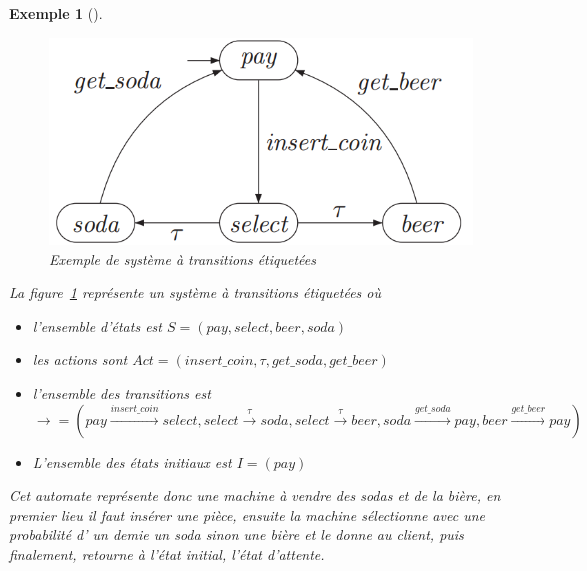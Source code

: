 \documentclass[a4paper]{report}
\theoremstyle{break}
\newtheorem{exem}{Exemple}
\begin{document}
\begin{exem}[\cite{baier2008principles}]
$\quad$
\begin{figure}[h]
\begin{center}
\includegraphics[scale=0.5]{images/exemplts.png}
\caption{Exemple de système à transitions étiquetées \cite{baier2008principles}}
\label{exemplts}
\end{center}
\end{figure}

La figure~\ref{exemplts} représente un système à transitions étiquetées où
\begin{itemize}
\item l'ensemble d'états est $S = (pay, select, beer, soda)$
\item les actions sont $Act = (insert\_coin, \tau, get\_soda, get\_beer)$
\item l'ensemble des transitions est $\rightarrow = (pay\xrightarrow{insert\_coin}{}select, select\xrightarrow{\tau}{}soda, select\xrightarrow{\tau}{}beer, soda\xrightarrow{get\_soda}{}pay, beer\xrightarrow{get\_beer}{}pay)$
\item L'ensemble des états initiaux est $I = (pay)$
\end{itemize}
Cet automate représente donc une machine à vendre des sodas et de la bière, en premier lieu il faut insérer une pièce, ensuite la machine sélectionne avec une probabilité d’ un demie un soda sinon une bière et le donne au client, puis finalement, retourne à l'état initial, l'état d'attente.


\end{exem}
\end{document}
